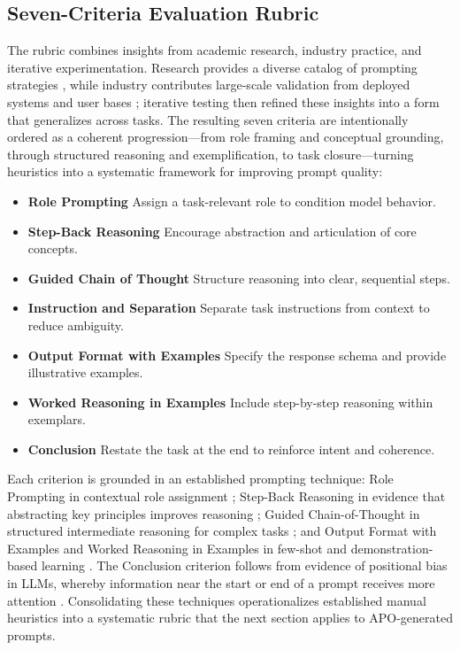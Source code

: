 \documentclass[a4paper,fleqn]{cas-sc}
\begin{document}
\subsection{Seven-Criteria Evaluation Rubric}

The rubric combines insights from academic research, industry practice, and iterative experimentation. Research provides a diverse catalog of prompting strategies \citep{schulhoff2024,sahoo2024}, while industry contributes large-scale validation from deployed systems and user bases \citep{boonstra2025,anthropic2025,openai2025,microsoft2025}; iterative testing then refined these insights into a form that generalizes across tasks. The resulting seven criteria are intentionally ordered as a coherent progression---from role framing and conceptual grounding, through structured reasoning and exemplification, to task closure---turning heuristics into a systematic framework for improving prompt quality:

\begin{itemize}
\item \textbf{Role Prompting} Assign a task-relevant role to condition model behavior.
\item \textbf{Step-Back Reasoning} Encourage abstraction and articulation of core concepts.
\item \textbf{Guided Chain of Thought} Structure reasoning into clear, sequential steps.
\item \textbf{Instruction and Separation} Separate task instructions from context to reduce ambiguity.
\item \textbf{Output Format with Examples} Specify the response schema and provide illustrative examples.
\item \textbf{Worked Reasoning in Examples} Include step-by-step reasoning within exemplars.
\item \textbf{Conclusion} Restate the task at the end to reinforce intent and coherence.
\end{itemize}

Each criterion is grounded in an established prompting technique: Role Prompting in contextual role assignment \citep{wang2024b,kong2024}; Step-Back Reasoning in evidence that abstracting key principles improves reasoning \citep{zheng2024,codaforno2024}; Guided Chain-of-Thought in structured intermediate reasoning for complex tasks \citep{wei2022,kojima2022}; and Output Format with Examples and Worked Reasoning in Examples in few-shot and demonstration-based learning \citep{winata2023,min2022}. The Conclusion criterion follows from evidence of positional bias in LLMs, whereby information near the start or end of a prompt receives more attention \citep{yu2025,liu2024}. Consolidating these techniques operationalizes established manual heuristics into a systematic rubric that the next section applies to APO-generated prompts.
\end{document}
